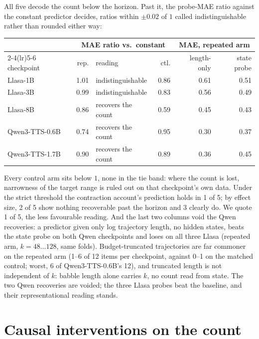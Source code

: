 All five decode the count below the horizon. Past it, the probe-MAE
ratio against the constant predictor decides, ratios within $\pm0.02$
of $1$ called indistinguishable rather than rounded either way:
\begin{center}
\begin{tabular}{lrlrrr}
\toprule
 & \multicolumn{3}{c}{MAE ratio vs.\ constant} & \multicolumn{2}{c}{MAE, repeated arm} \\
\cmidrule(lr){2-4}\cmidrule(lr){5-6}
checkpoint & rep. & reading & ctl. & length-only & state probe \\
\midrule
Llasa-1B       & 1.01 & indistinguishable & 0.86 & 0.61 & 0.51 \\
Llasa-3B       & 0.99 & indistinguishable & 0.83 & 0.56 & 0.49 \\
Llasa-8B       & 0.86 & recovers the count & 0.59 & 0.45 & 0.43 \\
Qwen3-TTS-0.6B & 0.74 & recovers the count & 0.95 & 0.30 & 0.37 \\
Qwen3-TTS-1.7B & 0.90 & recovers the count & 0.89 & 0.36 & 0.45 \\
\bottomrule
\end{tabular}
\end{center}
Every control arm sits below $1$, none in the tie band: where the count
is lost, narrowness of the target range is ruled out on that
checkpoint's own data. Under the strict threshold the contraction
account's prediction holds in 1 of 5; by effect size, 2 of 5 show
nothing recoverable past the horizon and 3 clearly do. We quote 1 of 5,
the less favourable reading. And the last two columns void the Qwen
recoveries: a predictor given only log trajectory length, no hidden
states, beats the state probe on both Qwen checkpoints and loses on all
three Llasa (repeated arm, $k=48\ldots128$, same folds).
Budget-truncated trajectories are far commoner on the repeated arm
(1--6 of 12 items per checkpoint, against 0--1 on the matched control;
worst, 6 of Qwen3-TTS-0.6B's 12), and truncated length is not
independent of $k$: babble length alone carries $k$, no count read from
state. The two Qwen recoveries are voided; the three Llasa probes beat
the baseline, and their representational reading stands.

\section{Causal interventions on the count}
\label{sec:causal}

